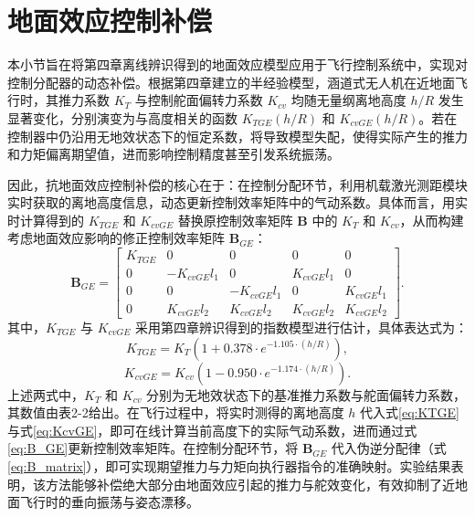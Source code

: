 \section{地面效应控制补偿}
\label{sec:ge_compensate}

本小节旨在将第四章离线辨识得到的地面效应模型应用于飞行控制系统中，实现对控制分配器的动态补偿。根据第四章建立的半经验模型，涵道式无人机在近地面飞行时，其推力系数 \(K_T\) 与控制舵面偏转力系数 \(K_{cv}\) 均随无量纲离地高度 \(h/R\) 发生显著变化，分别演变为与高度相关的函数 \(K_{TGE}(h/R)\) 和 \(K_{cvGE}(h/R)\)。若在控制器中仍沿用无地效状态下的恒定系数，将导致模型失配，使得实际产生的推力和力矩偏离期望值，进而影响控制精度甚至引发系统振荡。

因此，抗地面效应控制补偿的核心在于：在控制分配环节，利用机载激光测距模块实时获取的离地高度信息，动态更新控制效率矩阵中的气动系数。具体而言，用实时计算得到的 \(K_{TGE}\) 和 \(K_{cvGE}\) 替换原控制效率矩阵 \(\bm{B}\) 中的 \(K_T\) 和 \(K_{cv}\)，从而构建考虑地面效应影响的修正控制效率矩阵 \(\bm{B}_{GE}\)：
\begin{equation}
    \bm{B}_{GE} = 
    \begin{bmatrix}
        K_{TGE} & 0 & 0 & 0 & 0 \\
        0 & -K_{cvGE} l_1 & 0 & K_{cvGE} l_1 & 0 \\
        0 & 0 & -K_{cvGE} l_1 & 0 & K_{cvGE} l_1 \\
        0 & K_{cvGE} l_2 & K_{cvGE} l_2 & K_{cvGE} l_2 & K_{cvGE} l_2
    \end{bmatrix}.
    \label{eq:B_GE}
\end{equation}
其中，\(K_{TGE}\) 与 \(K_{cvGE}\) 采用第四章辨识得到的指数模型进行估计，具体表达式为：
\begin{equation}
    K_{TGE} = K_{T}\left(1 + 0.378 \cdot e^{-1.105 \cdot (h/R)}\right),
    \label{eq:KTGE}
\end{equation}
\begin{equation}
    K_{cvGE} = K_{cv}\left(1 - 0.950 \cdot e^{-1.174 \cdot (h/R)}\right).
    \label{eq:KcvGE}
\end{equation}
上述两式中，\(K_T\) 和 \(K_{cv}\) 分别为无地效状态下的基准推力系数与舵面偏转力系数，其数值由表2-2给出。在飞行过程中，将实时测得的离地高度 \(h\) 代入式\eqref{eq:KTGE}与式\eqref{eq:KcvGE}，即可在线计算当前高度下的实际气动系数，进而通过式\eqref{eq:B_GE}更新控制效率矩阵。在控制分配环节，将 \(\bm{B}_{GE}\) 代入伪逆分配律（式\eqref{eq:B_matrix}），即可实现期望推力与力矩向执行器指令的准确映射。实验结果表明，该方法能够补偿绝大部分由地面效应引起的推力与舵效变化，有效抑制了近地面飞行时的垂向振荡与姿态漂移。

